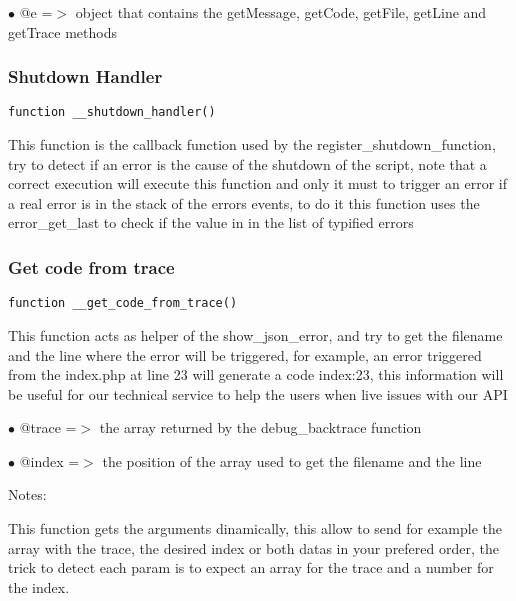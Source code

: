 \documentclass[a4paper]{article}
\begin{document}
\begin{compactitem}
\item[\color{myblue}$\bullet$] @e =$>$ object that contains the getMessage, getCode, getFile, getLine and getTrace
      methods
\end{compactitem}

\hypertarget{toc116}{}
\subsubsection{Shutdown Handler}

\begin{lstlisting}
function __shutdown_handler()
\end{lstlisting}

This function is the callback function used by the register\_shutdown\_function, try to
detect if an error is the cause of the shutdown of the script, note that a correct
execution will execute this function and only it must to trigger an error if a real
error is in the stack of the errors events, to do it this function uses the error\_get\_last
to check if the value in in the list of typified errors

\hypertarget{toc117}{}
\subsubsection{Get code from trace}

\begin{lstlisting}
function __get_code_from_trace()
\end{lstlisting}

This function acts as helper of the show\_json\_error, and try to get the filename and the line
where the error will be triggered, for example, an error triggered from the index.php at line
23 will generate a code index:23, this information will be useful for our technical service
to help the users when live issues with our API

\begin{compactitem}
\item[\color{myblue}$\bullet$] @trace =$>$ the array returned by the debug\_backtrace function
\item[\color{myblue}$\bullet$] @index =$>$ the position of the array used to get the filename and the line
\end{compactitem}

Notes:

This function gets the arguments dinamically, this allow to send for example the array with
the trace, the desired index or both datas in your prefered order, the trick to detect each
param is to expect an array for the trace and a number for the index.
\end{document}
